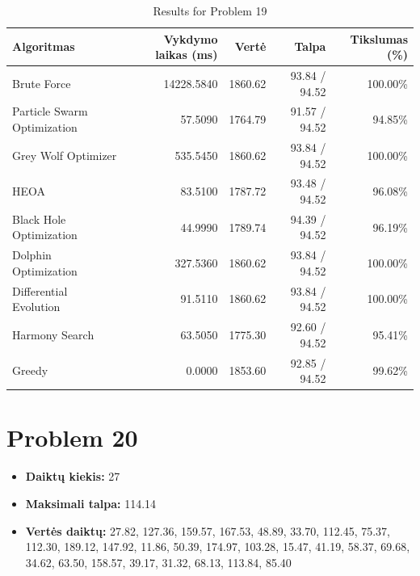 \documentclass[a4paper,11pt]{article}
\begin{document}
\begin{table}[h!]
\centering
\begin{tabular}{lrrrr}
\toprule
\textbf{Algoritmas} & \textbf{Vykdymo laikas (ms)} & \textbf{Vertė} & \textbf{Talpa} & \textbf{Tikslumas (\%)} \\
\midrule
Brute Force & 14228.5840 & 1860.62 & 93.84 / 94.52 & 100.00\% \\
Particle Swarm Optimization & 57.5090 & 1764.79 & 91.57 / 94.52 & 94.85\% \\
Grey Wolf Optimizer & 535.5450 & 1860.62 & 93.84 / 94.52 & 100.00\% \\
HEOA & 83.5100 & 1787.72 & 93.48 / 94.52 & 96.08\% \\
Black Hole Optimization & 44.9990 & 1789.74 & 94.39 / 94.52 & 96.19\% \\
Dolphin Optimization & 327.5360 & 1860.62 & 93.84 / 94.52 & 100.00\% \\
Differential Evolution & 91.5110 & 1860.62 & 93.84 / 94.52 & 100.00\% \\
Harmony Search & 63.5050 & 1775.30 & 92.60 / 94.52 & 95.41\% \\
Greedy & 0.0000 & 1853.60 & 92.85 / 94.52 & 99.62\% \\
\bottomrule
\end{tabular}
\caption{Results for Problem 19}
\end{table}
\clearpage

\section*{Problem 20}
\begin{itemize}
    \item \textbf{Daiktų kiekis:} 27
    \item \textbf{Maksimali talpa:} 114.14
    \item \textbf{Vertės daiktų:} 27.82, 127.36, 159.57, 167.53, 48.89, 33.70, 112.45, 75.37, 112.30, 189.12, 147.92, 11.86, 50.39, 174.97, 103.28, 15.47, 41.19, 58.37, 69.68, 34.62, 63.50, 158.57, 39.17, 31.32, 68.13, 113.84, 85.40
\end{itemize}
\end{document}
